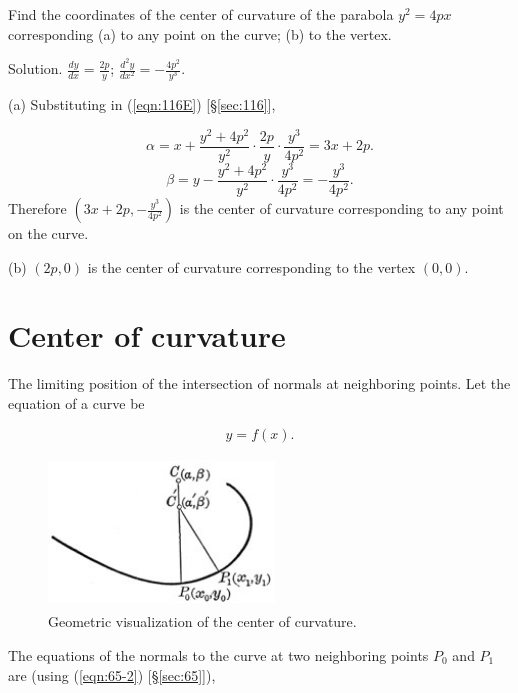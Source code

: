 \begin{example}
Find the coordinates of the center of curvature of the 
parabola $y^2 = 4px$ corresponding (a) to any point on the curve; 
(b) to the vertex.

Solution. $\frac{dy}{dx} = \frac{2p}{y}$; 
$\frac{d^2 y}{dx^2} = -\frac{4p^2}{y^3}$.

(a) Substituting in (\ref{eqn:116E}) [\S \ref{sec:116}],

\[
    \alpha = x + \frac{y^2 + 4 p^2}{y^2} \cdot \frac{2p}{y} 
\cdot \frac{y^3}{4 p^2} = 3x + 2p.
\]
\[
    \beta = y - \frac{y^2 + 4 p^2}{y^2} \cdot \frac{y^3}{4 p^2} 
= -\frac{y^3}{4 p ^2}.
\]
Therefore $\left( 3x + 2p, -\frac{y^3}{4 p^2} \right)$ 
is the center of curvature corresponding to any point on the curve.

(b) $(2p,0)$ is the center of curvature corresponding to the vertex 
$(0, 0)$.
\end{example}

\section{Center of curvature}
\label{sec:118}

The limiting position of the intersection of normals at neighboring 
points. Let the equation of a curve be

\begin{equation}
\label{eqn:118A}
y = f(x).
\end{equation}

\begin{figure}[h!]
\begin{minipage}{\textwidth}
\begin{center}
\includegraphics[height=4cm,width=6cm]{circle-of-curvature3.eps}
\end{center}
\end{minipage}
\caption{Geometric visualization of the center of curvature.}
\label{fig:circle-of-curvature3}
\end{figure}
The equations of the normals to the curve at two neighboring 
points $P_0$ and $P_1$ are (using (\ref{eqn:65-2}) [\S \ref{sec:65}]),

